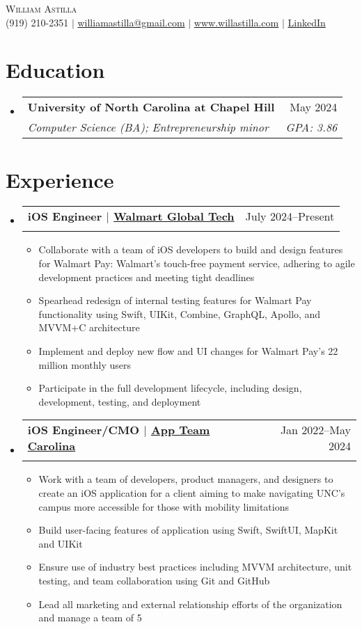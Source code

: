 \documentclass[letterpaper,11pt]{article}
\makeatletter
\newcommand{\resumeItem}[1]{
  \item\small{
    {#1 \vspace{-2pt}}
  }
}
\newcommand{\resumeSubheading}[4]{
  \vspace{-2pt}\item
    \begin{tabular*}{0.97\textwidth}[t]{l@{\extracolsep{\fill}}r}
      \textbf{#1} & #2 \\
      \textit{\small#3} & \textit{\small #4} \\
    \end{tabular*}\vspace{-7pt}
}
\newcommand{\resumeSubHeadingListStart}{\begin{itemize}[leftmargin=0.15in, label={}]}
\newcommand{\resumeSubHeadingListEnd}{\end{itemize}}
\newcommand{\resumeItemListStart}{\begin{itemize}}
\newcommand{\resumeItemListEnd}{\end{itemize}\vspace{-5pt}}
\makeatother
\begin{document}
\begin{center}
    {\Huge \scshape William Astilla} \\ \vspace{2pt}
    \small
    (919) 210-2351 $|$ \href{mailto:williamastilla@gmail.com}{williamastilla@gmail.com} $|$ \href{https://www.willastilla.com}{www.willastilla.com} $|$ \href{https://www.linkedin.com/in/willastilla}{LinkedIn}
\end{center}

\section{Education}
  \resumeSubHeadingListStart
    \resumeSubheading
      {University of North Carolina at Chapel Hill}{May 2024}
      {Computer Science (BA); Entrepreneurship minor}{\textit{GPA: 3.86}}
  \resumeSubHeadingListEnd

\section{Experience}
  \resumeSubHeadingListStart
    \resumeSubheading
      {iOS Engineer $|$ \href{https://walmart.com}{Walmart Global Tech}}{July 2024--Present}
      {}{}
      \resumeItemListStart
        \resumeItem{Collaborate with a team of iOS developers to build and design features for Walmart Pay: Walmart's touch-free payment service, adhering to agile development practices and meeting tight deadlines}
        \resumeItem{Spearhead redesign of internal testing features for Walmart Pay functionality using Swift, UIKit, Combine, GraphQL, Apollo, and MVVM+C architecture}
        \resumeItem{Implement and deploy new flow and UI changes for Walmart Pay's 22 million monthly users}
        \resumeItem{Participate in the full development lifecycle, including design, development, testing, and deployment}
      \resumeItemListEnd
    \resumeSubheading
      {iOS Engineer/CMO $|$ \href{https://appteamcarolina.com}{App Team Carolina}}{Jan 2022--May 2024}
      {}{}
      \resumeItemListStart
        \resumeItem{Work with a team of developers, product managers, and designers to create an iOS application for a client aiming to make navigating UNC's campus more accessible for those with mobility limitations}
        \resumeItem{Build user-facing features of application using Swift, SwiftUI, MapKit and UIKit}
        \resumeItem{Ensure use of industry best practices including MVVM architecture, unit testing, and team collaboration using Git and GitHub}
        \resumeItem{Lead all marketing and external relationship efforts of the organization and manage a team of 5}
      \resumeItemListEnd
  \resumeSubHeadingListEnd
\end{document}
